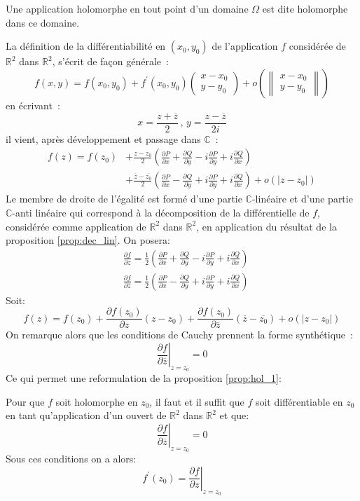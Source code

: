 \begin{fdefn}
Une application holomorphe en tout point d'un domaine $\Omega$ est
dite holomorphe dans ce domaine.
\end{fdefn}

La définition de la différentiabilité en $(x_0,y_0)$ de l'application
$f$ considérée de $\mathbb{R}^2$ dans $\mathbb{R}^2$, s'écrit de façon
générale~: 
\[
f(x,y) = f(x_0,y_0) + f^\prime(x_0,y_0) \left ( \begin{array}{c} x-x_0 \\ y-y_0 \end{array} \right )
+o \left ( \left \|  \begin{array}{c} x-x_0 \\ y-y_0 \end{array} \right \| \right )
\]
en écrivant~:
\[
x = \frac{z+\overline{z}}{2} \, , \, y = \frac{z-\overline{z}}{2i}
\]
il vient, après développement et passage dans $\mathbb{C}$~:
\begin{align*}
f(z) = f(z_0) &+ \frac{z-z_0}{2} 
\left (
\frac{\partial P}{\partial x} + \frac{\partial Q}{\partial y} - i 
\frac{\partial P}{\partial y} + i \frac{\partial Q}{\partial x}
\right ) \\&+
\frac{\overline{z}-\overline{z_0}}{2} 
\left (
\frac{\partial P}{\partial x} - \frac{\partial Q}{\partial y} + i 
\frac{\partial P}{\partial y} + i \frac{\partial Q}{\partial x}
\right ) + o(|z-z_0|)
\end{align*}
Le membre de droite de l'égalité est formé d'une partie $\mathbb{C}$-linéaire et
d'une partie $\mathbb{C}$-anti linéaire qui correspond à la décomposition de la
différentielle de $f$, considérée comme application de $\mathbb{R}^2$ dans
$\mathbb{R}^2$, en application du résultat de la proposition \ref{prop:dec_lin}.
On posera:
\begin{align*}
&\frac{\partial f}{\partial z} = \frac{1}{2} \left (\frac{\partial P}{\partial x} + \frac{\partial
Q}{\partial y} - i \frac{\partial P}{\partial y} + i \frac{\partial Q}{\partial x} \right) \\
& \frac{\partial f}{\partial \overline{z}} = \frac{1}{2} \left (\frac{\partial P}{\partial x} -
\frac{\partial Q}{\partial y} + i
\frac{\partial P}{\partial y} + i \frac{\partial Q}{\partial x}
\right)
\end{align*}
Soit:
\[
f(z)=f(z_0)+\frac{\partial f(z_0)}{\partial z}(z-z_0)+\frac{\partial
f(z_0)}{\partial \overline{z}}(\overline{z}-\overline{z_0})+o(|z-z_0|)
\]
On remarque alors que les conditions de Cauchy prennent la forme synthétique~:
\[
\left . \frac{\partial f }{\partial \overline{z}} \right |_{z = z_0} = 0
\]
Ce qui permet une reformulation de la proposition \ref{prop:hol_1}:
\begin{fprop}
Pour que $f$ soit holomorphe en $z_0$, il faut et il suffit que $f$ soit différentiable en $z_0$ en tant qu'application d'un
  ouvert de $\mathbb{R}^2$ dans $\mathbb{R}^2$ et que:
\[
\left . \frac{\partial f }{\partial \overline{z}} \right |_{z = z_0} = 0
\]
Sous ces conditions on a alors:
\[
f^\prime(z_0) = \left . \frac{\partial f }{\partial z} \right |_{z = z_0} 
\]
\end{fprop}

